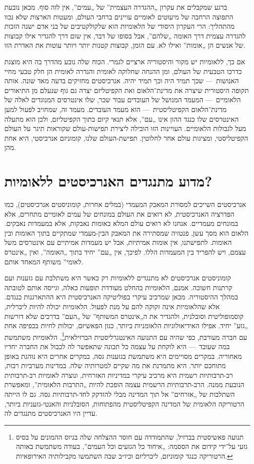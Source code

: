 ברגע שמקבלים את עקרון „ההגדרה העצמית” של „עמים”, אין לזה סוף. מכאן נובעת התפוצה הרחבה של מיעוטים לאומיים עויינים ברחבי העולם, ומעטות הארצות שלא נכוו מהתהליך: הרי העקרון היסודי של הלאומיות הוא שלקולקטיבים של בני אדם ישנה הזכות להגדרה עצמית דרך האומה „שלהם”, אבל בסופו של דבר, אין שום דרך להגדיר אילו קבוצות של אנשים הן „אומות” ואילו לא. עם הזמן, קבוצות קטנות יותר ויותר עוטות את האדרת הזו.

אם כך, ללאומיות יש מקור והיסטוריה ארציים לגמרי. הכוח שלה נובע מהדרך בה היא מוצגת כדרכו הטבעית של העולם, ומן ההנחה שחלוקה לאומית והגדרה לאומית הן חלק טבעי מחיי האנושות~— שכך תמיד היה וכך תמיד יהיה. אנרכיסטים מחזיקים בדעה מאד שונה. אותה תקופה היסטורית שיצרה את מדינת־הלאום ואת הקפיטליזם יצרה גם גוף שנעלם מן התיאורים הלאומיים~— המעמד המנושל של העובדים עבור שכר, שלו אינטרסים המנוגדים לאלה של מדינת־הלאום הקפיטליסטית~— הוא מעמד העובדים. מעמד זה, שמחויב לפעול למען האינטרסים שלו כנגד ההון אינו „עם”, אלא תנאי קיום בתוך הקפיטליזם, ולכן הוא מתעלה מעל לגבולות הלאומיים. העויינות הזו הובילה ליצירת תפישות-עולם שקוראות תיגר על העולם הקפיטליסטי, ומציגות עולם אחר לחלוטין. תפישת-העולם שלנו, קומוניזם אנרכיסטי, היא אחת מהן.



\section*{מדוע מתנגדים האנרכיסטים ללאומיות?}

אנרכיסטים השייכים למסורת המאבק המעמדי (במלים אחרות, קומוניסטים אנרכיסטים), כמו הפדרציה האנרכיסטית, לא רואים את העולם במונחים של עמים לאומיים מתחרים, אלא במונחים מעמדיים. אנחנו לא רואים עולם המלא באומות נאבקות, אלא במעמדות נאבקים. הלאום הוא מסך עשן, פנטזיה שמסתירה את המאבק הבין-מעמדי שמתקיים בתוך האומות ובין האומות. לתפישתנו, אין אומות אמיתיות, אבל יש מעמדות אמיתיים עם אינטרסים משל עצמם, ויש להפריד בין המעמדות הללו. לפיכך, אין „עם” יחיד בתוך „האומה”, ואין „אינטרס לאומי” משותף המאחד אותם.

קומוניסטים אנרכיסטים לא מתנגדים ללאומיות רק כאשר היא משתלבת עם גזענות ועם קרתנות חשוכה. אמנם, הלאומיות בהחלט מעודדת תופעות כאלה, וגייסה אותם לטובתה במהלך ההיסטוריה. מכאן שמרכיב עיקרי בפוליטיקה האנרכיסטית היא ההתארגנות כנגדם. אלא שהלאומיות אינה זקוקה להם על מנת לפעול. הלאומיות יכולה להיות ליברלית, קוסמופוליטית וסובלנית, ולהגדיר את ה„אינטרס המשותף” של „העם” בדרכים שלא דורשות „גזע” יחיד. אפילו האידיאולוגיות הלאומניות ביותר, כגון הפאשיזם, יכולות לחיות בכפיפה אחת עם חברה מעורבת, כפי שהיה עם התנועה האינטגרליסטית הברזילאית\footnote{תנועה פאשיסטית בברזיל, שהתמודדה עם חוסר ההצלחה שלה בגיוס ההמונים על בסיס גזעי על־ידי קידום את הססמה: „איחוד כל הגזעים וכל העמים”, בעודה משתמשת באותה הרטוריקה כנגד קומוניזם, ליברליזם וכיו״ב שבה השתמשו מקבילותיה האירופאיות.}. הלאומיות משתמשת במה שעובד~— היא לוקחת על עצמה כל תכונה שתאפשר לה לכבול את החברה יחדיו מאחוריה. במקרים מסויימים היא משתמשת בגזענות גסה, במקרים אחרים היא נוהגת באופן מתוחכם יותר. היא מתמרנת את מה שקיים למטרותיה שלה. במדינות מערביות רבות, רב-תרבותיות רשמית היא מרכיב עיקרי במדיניות האזרחית, ונוצרה לאומיות רב-תרבותית הנובעת ממנה. הרב-תרבותיות הרשמית עצמה הופכת להיות „התרבות הלאומית”, ומאפשרת השתלבות של „אזרחים” אל תוך המדינה מבלי להזדקק לחד-תרבותיות גסה. גם לו הייתה הרטוריקה הלאומית של המדינה הקפיטליסטית מהפתוחות, הסובלניות והאנטי-גזעניות ביותר, עדיין היו האנרכיסטים מתנגדים לה.

